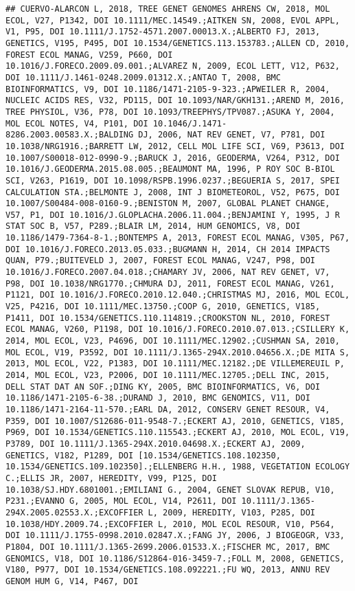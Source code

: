 \documentclass[]{article}
\begin{document}
\begin{verbatim}
## CUERVO-ALARCON L, 2018, TREE GENET GENOMES AHRENS CW, 2018, MOL ECOL, V27, P1342, DOI 10.1111/MEC.14549.;AITKEN SN, 2008, EVOL APPL, V1, P95, DOI 10.1111/J.1752-4571.2007.00013.X.;ALBERTO FJ, 2013, GENETICS, V195, P495, DOI 10.1534/GENETICS.113.153783.;ALLEN CD, 2010, FOREST ECOL MANAG, V259, P660, DOI 10.1016/J.FORECO.2009.09.001.;ALVAREZ N, 2009, ECOL LETT, V12, P632, DOI 10.1111/J.1461-0248.2009.01312.X.;ANTAO T, 2008, BMC BIOINFORMATICS, V9, DOI 10.1186/1471-2105-9-323.;APWEILER R, 2004, NUCLEIC ACIDS RES, V32, PD115, DOI 10.1093/NAR/GKH131.;AREND M, 2016, TREE PHYSIOL, V36, P78, DOI 10.1093/TREEPHYS/TPV087.;ASUKA Y, 2004, MOL ECOL NOTES, V4, P101, DOI 10.1046/J.1471-8286.2003.00583.X.;BALDING DJ, 2006, NAT REV GENET, V7, P781, DOI 10.1038/NRG1916.;BARRETT LW, 2012, CELL MOL LIFE SCI, V69, P3613, DOI 10.1007/S00018-012-0990-9.;BARUCK J, 2016, GEODERMA, V264, P312, DOI 10.1016/J.GEODERMA.2015.08.005.;BEAUMONT MA, 1996, P ROY SOC B-BIOL SCI, V263, P1619, DOI 10.1098/RSPB.1996.0237.;BEGUERIA S, 2017, SPEI CALCULATION STA.;BELMONTE J, 2008, INT J BIOMETEOROL, V52, P675, DOI 10.1007/S00484-008-0160-9.;BENISTON M, 2007, GLOBAL PLANET CHANGE, V57, P1, DOI 10.1016/J.GLOPLACHA.2006.11.004.;BENJAMINI Y, 1995, J R STAT SOC B, V57, P289.;BLAIR LM, 2014, HUM GENOMICS, V8, DOI 10.1186/1479-7364-8-1.;BONTEMPS A, 2013, FOREST ECOL MANAG, V305, P67, DOI 10.1016/J.FORECO.2013.05.033.;BUGMANN H, 2014, CH 2014 IMPACTS QUAN, P79.;BUITEVELD J, 2007, FOREST ECOL MANAG, V247, P98, DOI 10.1016/J.FORECO.2007.04.018.;CHAMARY JV, 2006, NAT REV GENET, V7, P98, DOI 10.1038/NRG1770.;CHMURA DJ, 2011, FOREST ECOL MANAG, V261, P1121, DOI 10.1016/J.FORECO.2010.12.040.;CHRISTMAS MJ, 2016, MOL ECOL, V25, P4216, DOI 10.1111/MEC.13750.;COOP G, 2010, GENETICS, V185, P1411, DOI 10.1534/GENETICS.110.114819.;CROOKSTON NL, 2010, FOREST ECOL MANAG, V260, P1198, DOI 10.1016/J.FORECO.2010.07.013.;CSILLERY K, 2014, MOL ECOL, V23, P4696, DOI 10.1111/MEC.12902.;CUSHMAN SA, 2010, MOL ECOL, V19, P3592, DOI 10.1111/J.1365-294X.2010.04656.X.;DE MITA S, 2013, MOL ECOL, V22, P1383, DOI 10.1111/MEC.12182.;DE VILLEMEREUIL P, 2014, MOL ECOL, V23, P2006, DOI 10.1111/MEC.12705.;DELL INC, 2015, DELL STAT DAT AN SOF.;DING KY, 2005, BMC BIOINFORMATICS, V6, DOI 10.1186/1471-2105-6-38.;DURAND J, 2010, BMC GENOMICS, V11, DOI 10.1186/1471-2164-11-570.;EARL DA, 2012, CONSERV GENET RESOUR, V4, P359, DOI 10.1007/S12686-011-9548-7.;ECKERT AJ, 2010, GENETICS, V185, P969, DOI 10.1534/GENETICS.110.115543.;ECKERT AJ, 2010, MOL ECOL, V19, P3789, DOI 10.1111/J.1365-294X.2010.04698.X.;ECKERT AJ, 2009, GENETICS, V182, P1289, DOI [10.1534/GENETICS.108.102350, 10.1534/GENETICS.109.102350].;ELLENBERG H.H., 1988, VEGETATION ECOLOGY C.;ELLIS JR, 2007, HEREDITY, V99, P125, DOI 10.1038/SJ.HDY.6801001.;EMILIANI G., 2004, GENET SLOVAK REPUB, V10, P231.;EVANNO G, 2005, MOL ECOL, V14, P2611, DOI 10.1111/J.1365-294X.2005.02553.X.;EXCOFFIER L, 2009, HEREDITY, V103, P285, DOI 10.1038/HDY.2009.74.;EXCOFFIER L, 2010, MOL ECOL RESOUR, V10, P564, DOI 10.1111/J.1755-0998.2010.02847.X.;FANG JY, 2006, J BIOGEOGR, V33, P1804, DOI 10.1111/J.1365-2699.2006.01533.X.;FISCHER MC, 2017, BMC GENOMICS, V18, DOI 10.1186/S12864-016-3459-7.;FOLL M, 2008, GENETICS, V180, P977, DOI 10.1534/GENETICS.108.092221.;FU WQ, 2013, ANNU REV GENOM HUM G, V14, P467, DOI 
\end{verbatim}
\end{document}
